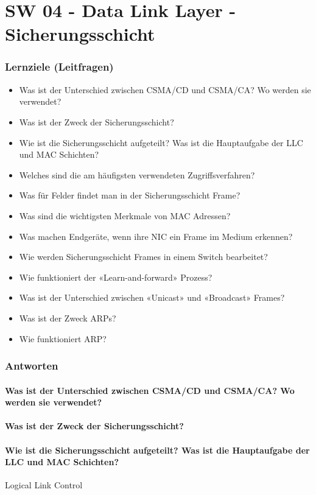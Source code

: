 \part{SW 04 - Data Link Layer - Sicherungsschicht}
\section{Lernziele (Leitfragen)}
\begin{itemize}
    \item Was ist der Unterschied zwischen CSMA/CD und CSMA/CA? Wo werden sie verwendet?
    \item Was ist der Zweck der Sicherungsschicht?
    \item Wie ist die Sicherungsschicht aufgeteilt? Was ist die Hauptaufgabe der LLC und MAC Schichten?
    \item Welches sind die am häufigsten verwendeten Zugriffsverfahren?
    \item Was für Felder findet man in der Sicherungsschicht Frame?
    \item Was sind die wichtigsten Merkmale von MAC Adressen?
    \item Was machen Endgeräte, wenn ihre NIC ein Frame im Medium erkennen?
    \item Wie werden Sicherungsschicht Frames in einem Switch bearbeitet?
    \item Wie funktioniert der «Learn-and-forward» Prozess?
    \item Was ist der Unterschied zwischen «Unicast» und «Broadcast» Frames?
    \item Was ist der Zweck ARPs?
    \item Wie funktioniert ARP?
\end{itemize}

\section{Antworten}
\subsection*{Was ist der Unterschied zwischen CSMA/CD und CSMA/CA? Wo werden sie verwendet?}
\subsection*{Was ist der Zweck der Sicherungsschicht?}
\subsection*{Wie ist die Sicherungsschicht aufgeteilt? Was ist die Hauptaufgabe der LLC und MAC Schichten?}
Logical Link Control
